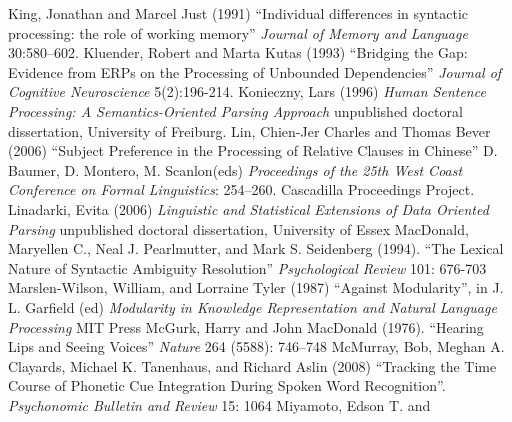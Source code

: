\documentclass[a4paper]{article}
\begin{document}
\newline
\newline
King, Jonathan and Marcel Just  (1991) ``Individual differences in syntactic processing: the role of working memory'' {\it Journal of Memory and Language} 30:580–602.
\newline
\newline
Kluender, Robert and Marta Kutas (1993) ``Bridging the Gap: Evidence from ERPs on the Processing of Unbounded Dependencies'' {\it Journal of Cognitive Neuroscience} 5(2):196-214.
\newline
\newline
Konieczny, Lars (1996) {\it Human Sentence Processing:
A Semantics-Oriented Parsing Approach} unpublished doctoral dissertation, University of Freiburg.
\newline
\newline
Lin, Chien-Jer Charles  and Thomas Bever (2006) ``Subject Preference in the Processing of Relative Clauses in Chinese'' D. Baumer, D. Montero, M. Scanlon(eds) {\it Proceedings of the 25th West Coast Conference on Formal Linguistics}: 254–260. Cascadilla Proceedings Project.
\newline
\newline
Linadarki, Evita (2006) {\it Linguistic and Statistical Extensions of Data
Oriented Parsing} unpublished doctoral dissertation, University of Essex
\newline
\newline
MacDonald, Maryellen C., 
Neal J. Pearlmutter,
and Mark S. Seidenberg  (1994).  ``The Lexical Nature of Syntactic 
Ambiguity Resolution'' 
{\it Psychological Review} 101: 676-703
\newline
\newline
Marslen-Wilson, William, and Lorraine Tyler (1987) ``Against Modularity'', in J. L.
Garfield (ed) {\it Modularity in Knowledge Representation and Natural Language Processing}
MIT Press
\newline
\newline
McGurk, Harry and John MacDonald (1976). ``Hearing Lips and Seeing Voices'' {\it Nature} 264 (5588): 746–748
\newline
\newline
McMurray, Bob, Meghan A. Clayards, Michael K. Tanenhaus, and Richard Aslin  (2008) ``Tracking the Time Course of Phonetic Cue Integration During Spoken Word Recognition''. {\it Psychonomic Bulletin and Review} 15: 1064
\newline
\newline
Miyamoto, Edson T. and
\end{document}
